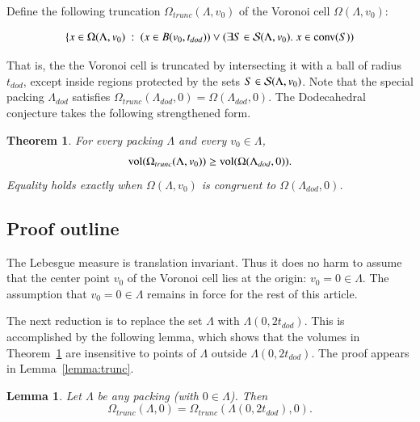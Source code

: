 \documentclass{article} %
\newtheorem{theorem}{Theorem}[section]
\newtheorem{lemma}{Lemma}[subsection]
\begin{document}

Define the following truncation $\Omega_{trunc}(\Lambda,v_0)$ 
of the Voronoi cell $\Omega(\Lambda,v_0)$:

$$
\{x \in \Omega(\Lambda,v_0) \ :\  (x\in B(v_0,t_{dod})) \vee (\exists S\in {\mathcal S}(\Lambda,v_0).\ x \in {\operatorname{conv}}(S))
$$



That is, the the Voronoi cell is truncated by intersecting it with a
ball of radius $t_{dod}$, except inside regions protected by the sets
$S\in{\mathcal S}(\Lambda,v_0)$. Note that the special packing
$\Lambda_{dod}$ satisfies 
$\Omega_{trunc}(\Lambda_{dod},0) = \Omega(\Lambda_{dod},0)$. 
The Dodecahedral conjecture takes the following strengthened form.

\begin{theorem}\label{thm:dodec}
  For every packing $\Lambda$ and every $v_0\in\Lambda$,
  $$
  {\operatorname{vol}}(\Omega_{trunc}(\Lambda,v_0))\ge {\operatorname{vol}}(\Omega(\Lambda_{dod},0)).
  $$
  Equality holds exactly when $\Omega(\Lambda,v_0)$ is congruent to
  $\Omega(\Lambda_{dod},0)$.
\end{theorem}

\subsection{Proof outline}
\label{sec:proof-outline}

The Lebesgue measure is translation invariant. Thus it does no harm to
assume that the center point $v_0$ of the Voronoi cell lies at the
origin: $v_0 = 0 \in \Lambda$. The assumption that $v_0=0 \in\Lambda$
remains in force for the rest of this article.

The next reduction is to replace the set $\Lambda$ with
$\Lambda(0,2t_{dod})$. This is accomplished by the following lemma,
which shows that the volumes in Theorem~\ref{thm:dodec} are
insensitive to points of $\Lambda$ outside $\Lambda(0,2t_{dod})$. The
proof appears in Lemma~\ref{lemma:trunc}.

\begin{lemma} 
  Let $\Lambda$ be any packing (with $0\in \Lambda$). Then
  $$\Omega_{trunc}(\Lambda,0) = \Omega_{trunc}(\Lambda(0,2t_{dod}),0).$$
\end{lemma}
\end{document}
